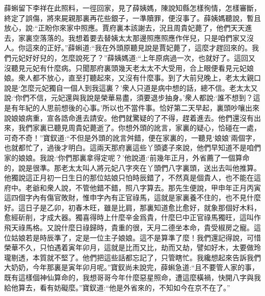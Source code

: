 \begin{parag}
    薛蝌留下李祥在此照料，一徑回家，見了薛姨媽，陳說知縣怎樣徇情，怎樣審斷，終定了誤傷，將來屍親那裏再花些銀子，一準贖罪，便沒事了。薛姨媽聽說，暫且放心，說:“正盼你來家中照應。賈府裏本該謝去，況且周貴妃薨了，他們天天進去，家裏空落落的。我想着要去替姨太太那邊照應照應作伴兒，只是咱們家又沒人。你這來的正好。”薛蝌道:“我在外頭原聽見說是賈妃薨了，這麼才趕回來的。我們元妃好好兒的，怎麼說死了？”薛姨媽道:“上年原病過一次，也就好了。這回又沒聽見元妃有什麼病。只聞那府裏頭幾天老太太不大受用，合上眼便看見元妃娘娘。衆人都不放心，直至打聽起來，又沒有什麼事。到了大前兒晚上，老太太親口說是‘怎麼元妃獨自一個人到我這裏？’衆人只道是病中想的話，總不信。老太太又說:‘你們不信，元妃還與我說是榮華易盡，須要退步抽身。’衆人都說:‘誰不想到？這是有年紀的人思前想後的心事。’所以也不當件事。恰好第二天早起，裏頭吵嚷出來說娘娘病重，宣各誥命進去請安。他們就驚疑的了不得，趕着進去。他們還沒有出來，我們家裏已聽見周貴妃薨逝了。你想外頭的訛言，家裏的疑心，恰碰在一處，可奇不奇！”寶釵道:“不但是外頭的訛言舛錯，便在家裏的，一聽見‘娘娘’兩個字，也就都忙了，過後才明白。這兩天那府裏這些丫頭婆子來說，他們早知道不是咱們家的娘娘。我說:‘你們那裏拿得定呢？’他說道:‘前幾年正月，外省薦了一個算命的，說是很準。那老太太叫人將元妃八字夾在丫頭們八字裏頭，送出去叫他推算。他獨說這正月初一日生日的那位姑娘只怕時辰錯了，不然真是個貴人，也不能在這府中。老爺和衆人說，不管他錯不錯，照八字算去。那先生便說，甲申年正月丙寅這四個字內有傷官敗財，惟申字內有正官祿馬，這就是家裏養不住的，也不見什麼好。這日子是乙卯，初春木旺，雖是比肩，那裏知道愈比愈好，就象那個好木料，愈經斫削，才成大器。獨喜得時上什麼辛金爲貴，什麼巳中正官祿馬獨旺，這叫作飛天祿馬格。又說什麼日祿歸時，貴重的很，天月二德坐本命，貴受椒房之寵。這位姑娘若是時辰準了，定是一位主子娘娘。這不是算準了麼！我們還記得說，可惜榮華不久，只怕遇着寅年卯月，這就是比而又比，劫而又劫，譬如好木，太要做玲瓏剔透，本質就不堅了。他們把這些話都忘記了，只管瞎忙。我纔想起來告訴我們大奶奶，今年那裏是寅年卯月呢。”寶釵尚未說完，薛蝌急道:“且不要管人家的事，既有這樣個神仙算命的，我想哥哥今年什麼惡星照命，遭這麼橫禍，快開八字與我給他算去，看有妨礙麼。”寶釵道:“他是外省來的，不知如今在京不在了。”
\end{parag}


